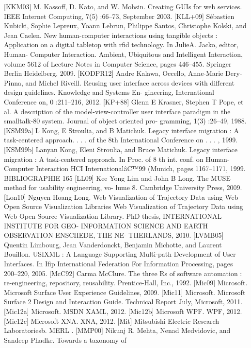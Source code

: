 \documentclass{article}
\begin{document}
[KKM03]
M. Kassoff, D. Kato, and W. Mohsin. Creating GUIs for web services. IEEE Internet
Computing, 7(5) :66–73, September 2003.
[KLL+09]
Sébastien Kubicki, Sophie Lepreux, Yoann Lebrun, Philippe Santos, Christophe
Kolski, and Jean Caelen. New human-computer interactions using tangible objects :
Application on a digital tabletop with rﬁd technology. In JulieA. Jacko, editor, Human-
Computer Interaction. Ambient, Ubiquitous and Intelligent Interaction, volume 5612
of Lecture Notes in Computer Science, pages 446–455. Springer Berlin Heidelberg,
2009.
[KODPR12]
Andre Kalawa, Occello, Anne-Marie Dery-Pinna, and Michel Riveill. Reusing user
interface across devices with different design guidelines. Knowledge and Systems En-
gineering, International Conference on, 0 :211–216, 2012.
[KP+88]
Glenn E Krasner, Stephen T Pope, et al. A description of the model-view-controller
user interface paradigm in the smalltalk-80 system. Journal of object oriented pro-
gramming, 1(3) :26–49, 1988.
[KSM99a]
L Kong, E Stroulia, and B Matichuk. Legacy interface migration : A task-centered
approach. . . . of the 8th International Conference on . . . , 1999.
[KSM99b]
Lanyan Kong, Eleni Stroulia, and Bruce Matichuk. Legacy interface migration : A
task-centered approach. In Proc. of 8 th int. conf. on Human-Computer Interaction
HCI InternationalâC™99 (Munich, pages 1167–1171, 1999.
BIBLIOGRAPHIE
165
[LL09]
Kee Yong Lim and John B Long. The MUSE method for usability engineering, vo-
lume 8. Cambridge University Press, 2009.
[Lon10]
Nguyen Hoang Long. Web Visualization of Trajectory Data using Web Open Source
Visualization Libraries Web Visualization of Trajectory Data using Web Open Source
Visualization Library.
PhD thesis, INTERNATIONAL INSTITUTE FOR GEO-
INFORMATION SCIENCE AND EARTH OBSERVATION ENSCHEDE, THE NE-
THERLANDS, 2010.
[LVMB05]
Quentin Limbourg, Jean Vanderdonckt, Benjamin Michotte, and Laurent Bouillon.
USIXML : A Language Supporting Multi-path Development of User Interfaces. In
Iﬁp International Federation For Information Processing, pages 200–220, 2005.
[McC92]
Carma McClure. The three Rs of software automation : re-engineering, repository,
reusability. Prentice-Hall, Inc., 1992.
[Mic09]
Microsoft. Microsoft Surface User Experience Guidelines, 2009.
[Mic11]
Microsoft. Microsoft Surface 2 Design and Interaction Guide. Technical Report July,
Microsoft, 2011.
[Mic12a]
Microsoft. MSDN XAML, 2012.
[Mic12b]
Microsoft WPF. WPF, 2012.
[Mic12c]
Microsoft XNA. XNA, 2012.
[Mit]
Mitsubishi Electric Research Laboratoriesb. MERL .
[MMP00]
Nikunj R. Mehta, Nenad Medvidovic, and Sandeep Phadke. Towards a taxonomy of
\end{document}
